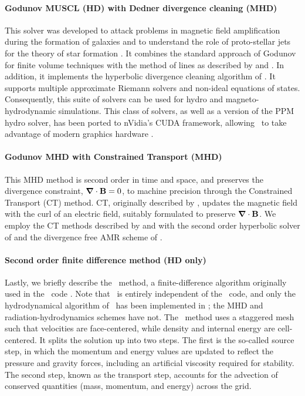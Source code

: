 \paragraph{Godunov MUSCL (HD) with Dedner divergence cleaning (MHD)}
This solver was developed to attack problems in magnetic field
amplification during the formation of galaxies \citep{Wang:2009a} and
to understand the role of proto-stellar jets for the theory of star
formation \citep{Wang:2009b}. It combines the standard approach of
Godunov \citep{Godunov1959} for finite volume techniques with the
method of lines as described by \cite{leveque2002finite} and
\cite{toro-1997}. In addition, it implements the hyperbolic divergence
cleaning algorithm of \cite{2002JCoPh.175..645D}. It supports multiple
approximate Riemann solvers and non-ideal equations of
states. Consequently, this suite of solvers can be used for hydro and
magneto-hydrodynamic simulations. This class of solvers, as
well as a version of the PPM hydro solver, has been ported to
nVidia's CUDA framework, allowing \enzo\ to take advantage of modern
graphics hardware \citep{Wang:2010}.

\paragraph{Godunov MHD with Constrained Transport (MHD)}
This MHD method is second order in time and space, and preserves the
divergence constraint, $\bm{\nabla} \cdot \mathbf{B} = 0$, to machine precision
through the Constrained Transport (CT) method.  CT, originally
described by \citet{Evans88}, updates the magnetic field with the curl
of an electric field, suitably formulated to preserve $\bm{\nabla} \cdot
\mathbf{B}$.  We employ the CT methods described by \citet{Balsara99} and
\citet{Gardiner05} with the second order hyperbolic
solver of \citet{Li08a} and the divergence free AMR scheme of
\citet{Balsara01}.

\paragraph{Second order finite difference method (HD only)}

Lastly, we briefly describe the \zeus\ method, a finite-difference
algorithm originally used in the \zeus\ code \citep{Stone92a}. Note
that \enzo\ is entirely independent of the \zeus\ code, and only the
hydrodynamical algorithm of \zeus\ has been implemented in \enzo; the
MHD and radiation-hydrodynamics schemes have not. The \zeus\ method
uses a staggered mesh such that velocities are face-centered, while
density and internal energy are cell-centered.  It splits the solution
up into two steps. The first is the so-called source step, in which
the momentum and energy values are updated to reflect the pressure and
gravity forces, including an artificial viscosity required for
stability. The second step, known as the transport step, accounts for
the advection of conserved quantities (mass, momentum, and energy)
across the grid.

